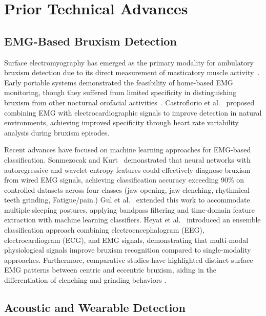 \documentclass[pdflatex,sn-vancouver-num, iicol]{sn-jnl}
\begin{document}
 \section{Prior Technical Advances}

\subsection{EMG-Based Bruxism Detection}

Surface electromyography has emerged as the primary modality for ambulatory bruxism detection due to its direct measurement of masticatory muscle activity~\cite{raez2006techniques}. Early portable systems demonstrated the feasibility of home-based EMG monitoring, though they suffered from limited specificity in distinguishing bruxism from other nocturnal orofacial activities~\cite{stuginski2016detection}. Castroflorio et al.~\cite{castroflorio2013use} proposed combining EMG with electrocardiographic signals to improve detection in natural environments, achieving improved specificity through heart rate variability analysis during bruxism episodes.

Recent advances have focused on machine learning approaches for EMG-based classification. Sonmezocak and Kurt~\cite{sonmezocak2021detection} demonstrated that neural networks with autoregressive and wavelet entropy features could effectively diagnose bruxism from wired EMG signals, achieving classification accuracy exceeding 90\% on controlled datasets across four classes (jaw opening, jaw clenching, rhythmical teeth grinding, Fatigue/pain.) Gul et al.~\cite{gul2024advanced} extended this work to accommodate multiple sleeping postures, applying bandpass filtering and time-domain feature extraction with machine learning classifiers. Heyat et al.~\cite{heyat2020computational} introduced an ensemble classification approach combining electroencephalogram (EEG), electrocardiogram (ECG), and EMG signals, demonstrating that multi-modal physiological signals improve bruxism recognition compared to single-modality approaches. Furthermore, comparative studies have highlighted distinct surface EMG patterns between centric and eccentric bruxism, aiding in the differentiation of clenching and grinding behaviors \cite{lan2022comparative}.

\subsection{Acoustic and Wearable Detection}
\end{document}
